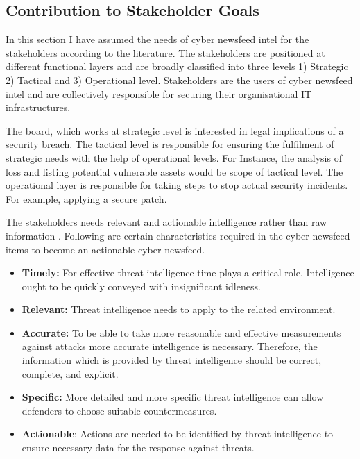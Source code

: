 \subsection{Contribution to Stakeholder Goals}
In this section I have assumed the needs of cyber newsfeed intel for the stakeholders according to the literature. The stakeholders are positioned at different functional layers and are broadly classified into three levels 1) Strategic 2) Tactical and 3) Operational level. Stakeholders
\citep{farnham2013tools} are the users of cyber newsfeed intel and are collectively responsible for securing their organisational IT infrastructures. 

The board, which works at strategic level is interested in legal implications of a security breach. 
The tactical level is responsible for ensuring the fulfilment of strategic needs with the help of operational levels. 
For Instance, the analysis of loss and listing potential vulnerable assets would be scope of tactical level. 
The operational layer is responsible for taking steps to stop actual security incidents. 
For example, applying a secure patch. 

The stakeholders needs relevant and actionable intelligence rather than raw information
\citep{tounsi2018survey}.  
Following are certain characteristics required in the cyber newsfeed items to become an actionable cyber newsfeed. 

\begin{itemize}
    \item \textbf{Timely:} For effective threat intelligence time plays a critical role. 
    Intelligence ought to be quickly conveyed with insignificant idleness. 
    
    \item \textbf{Relevant:} 
    Threat intelligence needs to apply to the related environment. 
    \item  \textbf{Accurate:} 
    To be able to take more reasonable and effective measurements against attacks more accurate intelligence is necessary. Therefore, the information which is provided by threat intelligence should be correct, complete, and explicit. 
    
    \item \textbf{Specific:} 
    More detailed and more specific threat intelligence can allow defenders to choose suitable countermeasures.
    
    \item \textbf{Actionable}: 
    Actions are needed to be identified by threat intelligence to ensure necessary data for the response against threats.

\end{itemize}


